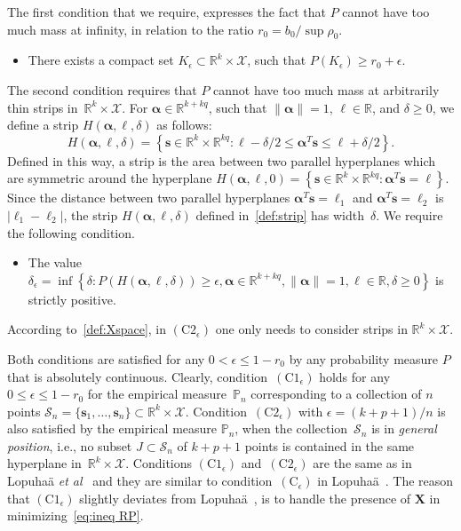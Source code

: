 \documentclass{article}
\numberwithin{equation}{section}
\theoremstyle{plain}
\newcommand{\R}{\mathbb{R}}
\newcommand{\balpha}{\bm\alpha}
\newcommand{\bX}{\mathbf{X}}
\begin{document}
The first condition that we require, expresses the fact that $P$
cannot have too much mass at infinity, in relation to the ratio $r_0=b_0/\sup\rho_0$.
\begin{itemize}
\item[$(\mathrm{C1}_\epsilon)$]
There exists a compact set $K_\epsilon\subset\R^k\times \mathcal{X}$,
such that $P(K_\epsilon)\geq r_0+\epsilon$.
\end{itemize}
The second condition requires that $P$ cannot have too much mass at arbitrarily thin strips in~$\R^k\times \mathcal{X}$.
For $\balpha\in\R^{k+kq}$, such that $\|\balpha\|=1$, $\ell\in\R$, and $\delta\geq0$, we define a strip
$H(\balpha,\ell,\delta)$ as follows:
\begin{equation}
\label{def:strip}
H(\balpha,\ell,\delta)
=
\left\{
\mathbf{s}\in\R^k\times\R^{kq}: \ell-\delta/2\leq \balpha^T\mathbf{s}\leq \ell+\delta/2
\right\}.
\end{equation}
Defined in this way, a strip is the area between two parallel hyperplanes
which are symmetric around the hyperplane $H(\balpha,\ell,0)
=
\left\{
\mathbf{s}\in\R^k\times\R^{kq}: \balpha^T\mathbf{s}=\ell
\right\}$.
Since the distance between two parallel hyperplanes
$\balpha^T\mathbf{s}=\ell_1$ and $\balpha^T\mathbf{s}=\ell_2$ is $|\ell_1-\ell_2|$,
the strip $H(\balpha,\ell,\delta)$ defined in~\eqref{def:strip} has width~$\delta$.
We require the following condition.
\begin{itemize}
\item[$(\mathrm{C2}_\epsilon)$]
The value
$
\delta_\epsilon
=
\inf
\left\{
\delta:
P\left(H(\balpha,\ell,\delta)
\right)\geq \epsilon,
\balpha\in\R^{k+kq},\|\balpha\|=1,\ell\in\R,\delta\geq 0
\right\}$
\newline
is strictly positive.
\end{itemize}
According to~\eqref{def:Xspace},  in $(\mathrm{C2}_\epsilon)$ one only needs to consider strips in $\R^k\times \mathcal{X}$.

Both conditions are satisfied for any $0<\epsilon\leq 1-r_0$ by any probability measure $P$
that is absolutely continuous.
Clearly, condition~$(\mathrm{C1}_\epsilon)$ holds for any $0\leq\epsilon\leq 1-r_0$ for
the empirical measure~$\mathbb{P}_n$ corresponding to a collection of $n$ points
$\mathcal{S}_n=\{\mathbf{s}_1,\ldots,\mathbf{s}_n\}\subset\R^k\times \mathcal{X}$.
Condition~$(\mathrm{C2}_\epsilon)$ with $\epsilon=(k+p+1)/n$
is also satisfied by the empirical measure $\mathbb{P}_n$, when the collection~$\mathcal{S}_n$ is in \emph{general position}, i.e.,
no subset $J\subset \mathcal{S}_n$ of $k+p+1$ points is contained in the same hyperplane
in~$\R^k\times \mathcal{X}$.
Conditions $(\mathrm{C1}_\epsilon)$ and~$(\mathrm{C2}_\epsilon)$ are the same as in
Lopuha\"a \textit{et al}~\cite{lopuhaa-gares-ruizgazen2023} and they
are similar to condition~$(\mathrm{C}_\epsilon)$
in Lopuha\"a~\cite{lopuhaa1989}.
The reason that $(\mathrm{C1}_\epsilon)$ slightly deviates from Lopuha\"a~\cite{lopuhaa1989}, is to handle
the presence of $\bX$ in minimizing~\eqref{eq:ineq RP}.
\end{document}
